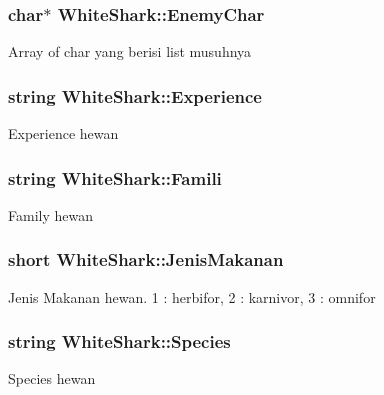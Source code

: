 \subsubsection[{\texorpdfstring{Enemy\+Char}{EnemyChar}}]{\setlength{\rightskip}{0pt plus 5cm}char$\ast$ White\+Shark\+::\+Enemy\+Char\hspace{0.3cm}{\ttfamily [protected]}}\hypertarget{class_white_shark_a94783e051b9953f63a3488a8c16aad53}{}\label{class_white_shark_a94783e051b9953f63a3488a8c16aad53}
Array of char yang berisi list musuhnya 
\subsubsection[{\texorpdfstring{Experience}{Experience}}]{\setlength{\rightskip}{0pt plus 5cm}string White\+Shark\+::\+Experience\hspace{0.3cm}{\ttfamily [protected]}}\hypertarget{class_white_shark_a3ce9a52ad564c2ba87bc6f9de2749133}{}\label{class_white_shark_a3ce9a52ad564c2ba87bc6f9de2749133}
Experience hewan 
\subsubsection[{\texorpdfstring{Famili}{Famili}}]{\setlength{\rightskip}{0pt plus 5cm}string White\+Shark\+::\+Famili\hspace{0.3cm}{\ttfamily [protected]}}\hypertarget{class_white_shark_a8f4b5c7e5a2edcf8d0806134c399b09e}{}\label{class_white_shark_a8f4b5c7e5a2edcf8d0806134c399b09e}
Family hewan 
\subsubsection[{\texorpdfstring{Jenis\+Makanan}{JenisMakanan}}]{\setlength{\rightskip}{0pt plus 5cm}short White\+Shark\+::\+Jenis\+Makanan\hspace{0.3cm}{\ttfamily [protected]}}\hypertarget{class_white_shark_a2e4c9b5364a9f251115274a8ccade032}{}\label{class_white_shark_a2e4c9b5364a9f251115274a8ccade032}
Jenis Makanan hewan. 1 \+: herbifor, 2 \+: karnivor, 3 \+: omnifor 
\subsubsection[{\texorpdfstring{Species}{Species}}]{\setlength{\rightskip}{0pt plus 5cm}string White\+Shark\+::\+Species\hspace{0.3cm}{\ttfamily [protected]}}\hypertarget{class_white_shark_adbd99cf2df950f913994567bab906a82}{}\label{class_white_shark_adbd99cf2df950f913994567bab906a82}
Species hewan 
